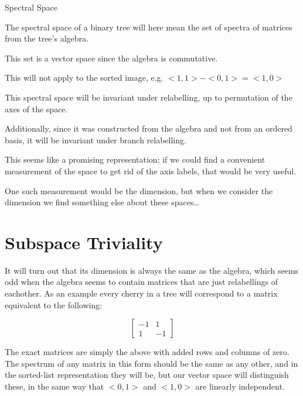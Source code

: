 \documentclass[10pt,a4paper]{report}
\begin{document}
\begin{definition}Spectral Space

	The spectral space of a binary tree will here mean the set of spectra of
	matrices from the tree's algebra.

	This set is a vector space since the algebra is commutative.
\end{definition}


This will not apply to the sorted image, e.g. $<1, 1> - <0, 1> = <1, 0>$

This spectral space will be invariant under relabelling, up to permutation of
the axes of the space.

Additionally, since it was constructed from the algebra and not from an ordered
basis, it will be invariant under branch relabelling.

This seems like a promising representation; if we could find a convenient
measurement of the space to get rid of the axis labels, that would be very
useful.

One such measurement would be the dimension, but when we consider the dimension
we find something else about these spaces\ldots


\section{Subspace Triviality}

It will turn out that its dimension is always the same as the algebra, which
seems odd when the algebra seems to contain matrices that are just relabellings
of eachother.
As an example every cherry in a tree will correspond to a matrix equivalent to
the following:

\[
	\left[ \begin{matrix}
		-1 & 1\\
		1 & -1
	\end{matrix} \right]
\]

The exact matrices are simply the above with added rows and columns of zero.
The spectrum of any matrix in this form should be the same as any other, and in
the sorted-list representation they will be, but our vector space will
distinguish these, in the same way that $<0, 1>$ and $<1, 0>$ are linearly
independent.
\end{document}
